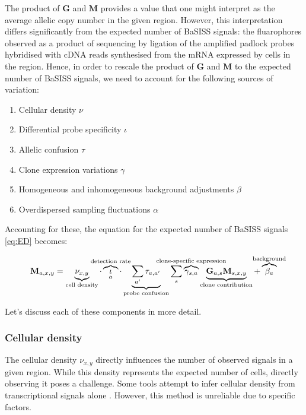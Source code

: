 The product of $\mathbf{G}$ and $\mathbf{M}$ provides a value that one might interpret as the average allelic copy number in the given region. However, this interpretation differs significantly from the expected number of BaSISS signals: the fluarophores observed as a product of sequencing by ligation of the amplified padlock probes hybridised with cDNA reads synthesised from the mRNA expressed by cells in the region. Hence, in order to rescale the product of $\mathbf{G}$ and $\mathbf{M}$ to the expected number of BaSISS signals, we need to account for the following sources of variation:

\begin{enumerate}
    \item Cellular density $\nu$
    \item Differential probe specificity $\iota$
    \item Allelic confusion $\tau$
    \item Clone expression variations $\gamma$
    \item Homogeneous and inhomogeneous background adjustments $\beta$
    \item Overdispersed sampling fluctuations $\alpha$
\end{enumerate}

Accounting for these, the equation for the expected number of BaSISS signals \cref{eq:ED} becomes:

\begin{equation} 
\mathbf{M}_{a, x,y} = \underbrace{\nu_{x,y}}_{\text{cell density}} \cdot \overbrace{\iota}_a^{\mathclap{\text{detection rate}}} \cdot \underbrace{\sum_{a'} \tau_{a,a'}}_{\text{probe confusion}} \sum_s  \overbrace{\gamma_{s,a}}^{\mathclap{\text{clone-specific expression}}} \underbrace{\mathbf{G}_{a,s} \mathbf{M}_{s,x,y}}_{\text{clone contribution}} + \overbrace{\beta_a}^{\mathclap{\text{background}}}
\label{eq:ED_full}\\
\end{equation} 

Let's discuss each of these components in more detail.

\subsubsection*{Cellular density}
The cellular density $\nu_{x,y}$ directly influences the number of observed signals in a given region. While this density represents the expected number of cells, directly observing it poses a challenge. Some tools attempt to infer cellular density from transcriptional signals alone \parencite{Kleshchevnikov2022-ub}. However, this method is unreliable due to  specific factors.

